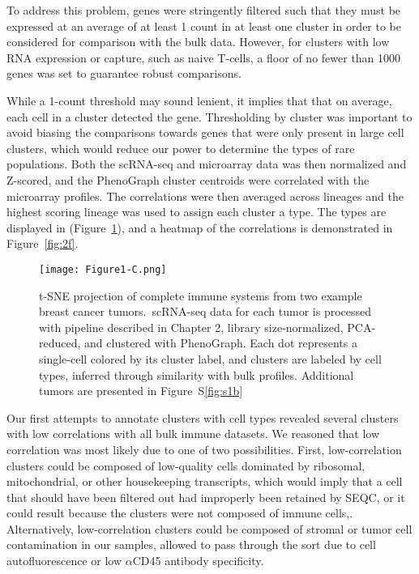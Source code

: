 To address this problem, genes were stringently filtered such that they must be expressed at an average of at least 1 count in at least one cluster in order to be considered for comparison with the bulk data. %
However, for clusters with low RNA expression or capture, such as naive T-cells, a floor of no fewer than 1000 genes was set to guarantee robust comparisons. 

While a 1-count threshold may sound lenient, it implies that that on average, each cell in a cluster detected the gene. 
Thresholding by cluster was important to avoid biasing the comparisons towards genes that were only present in large cell clusters, which would reduce our power to determine the types of rare populations. 
Both the scRNA-seq and microarray data was then normalized and Z-scored, and the PhenoGraph cluster centroids were correlated with the microarray profiles. 
The correlations were then averaged across lineages and the highest scoring lineage was used to assign each cluster a type. The types are displayed in (Figure~\ref{fig:1c}), and a heatmap of the correlations is demonstrated in Figure~\ref{fig:2f}.

\begin{figure}
\centering
\texttt{[image: Figure1-C.png]}
  \caption{t-SNE projection of complete immune systems from two example breast cancer tumors.\ scRNA-seq data for each tumor is processed with pipeline described in Chapter 2, library size-normalized, PCA-reduced, and clustered with PhenoGraph. Each dot represents a single-cell colored by its cluster label, and clusters are labeled by cell types, inferred through similarity with bulk profiles. Additional tumors are presented in Figure~S\ref{fig:s1b}} 
\label{fig:1c}
\end{figure} 

Our first attempts to annotate clusters with cell types revealed several clusters with low correlations with all bulk immune datasets. 
We reasoned that low correlation was most likely due to one of two possibilities. 
First, low-correlation clusters could be composed of low-quality cells dominated by ribosomal, mitochondrial, or other housekeeping transcripts, which would imply that a cell that should have been filtered out had improperly been retained by SEQC, or it could result because the clusters were not composed of immune cells,.
Alternatively, low-correlation clusters could be composed of stromal or tumor cell contamination in our samples, allowed to pass through the sort due to cell autofluorescence or low $\alpha$CD45 antibody specificity. 

